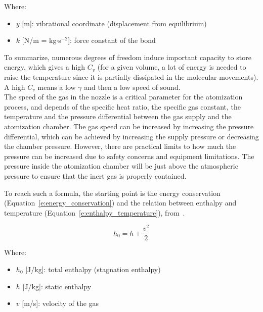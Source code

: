 \documentclass[../main]{subfiles}
\begin{document}
\vspace{0mm}
\begin{minipage}{\linewidth}
Where:
\begin{itemize}
    \item[] $y$ [m]: vibrational coordinate (displacement from equilibrium)
    \item[] $k$ [N/m = kg$\cdot$s$^{-2}$]: force constant of the bond
\end{itemize}
\end{minipage}
\vspace{0mm}


To summarize, numerous degrees of freedom induce important capacity to store energy, which gives a high ${C_v}$ (for a given volume, a lot of energy is needed to raise the temperature since it is partially dissipated in the molecular movements). A high ${C_v}$ means a low ${\gamma}$ and then a low speed of sound.\\

The speed of the gas in the nozzle is a critical parameter for the atomization process, and depends of the specific heat ratio, the specific gas constant, the temperature and the pressure differential between the gas supply and the atomization chamber. The gas speed can be increased by increasing the pressure differential, which can be achieved by increasing the supply pressure or decreasing the chamber pressure. However, there are practical limits to how much the pressure can be increased due to safety concerns and equipment limitations. The pressure inside the atomization chamber will be just above the atmospheric pressure to ensure that the inert gas is properly contained.

To reach such a formula, the starting point is the energy conservation (Equation~\ref{e:energy_conservation}) and the relation between enthalpy and temperature (Equation~\ref{e:enthalpy_temperature}), from~\cite{IsentropicFlow}.

\vspace{0mm}
\begin{equation}
h_{0} = h + \frac{v^{2}}{2}
\label{e:energy_conservation}
\end{equation}
\vspace{0mm}

\vspace{0mm}
\begin{minipage}{\linewidth}
    Where:
\begin{itemize}
    \item[] $h_{0}$ [J/kg]: total enthalpy (stagnation enthalpy)
    \item[] $h$ [J/kg]: static enthalpy
    \item[] $v$ [m/s]: velocity of the gas
\end{itemize}
\end{minipage}
\vspace{0mm}
\end{document}
